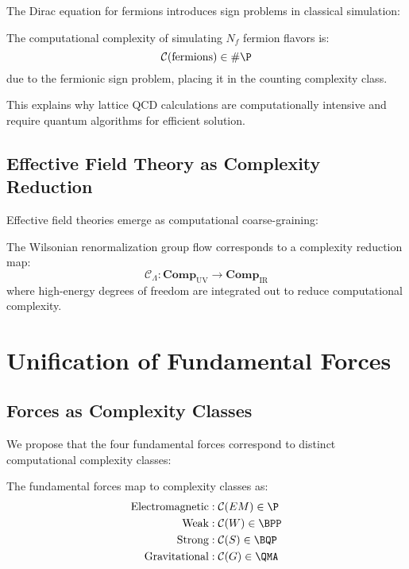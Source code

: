 \documentclass[12pt,a4paper]{article}
\newcommand{\comp}[1]{\mathcal{C}(#1)}
\newcommand{\cat}[1]{\mathbf{#1}}
\begin{document}
The Dirac equation for fermions introduces sign problems in classical simulation:

\begin{proposition}
The computational complexity of simulating $N_f$ fermion flavors is:
\begin{equation}
\comp{\text{fermions}} \in \#\P
\end{equation}
due to the fermionic sign problem, placing it in the counting complexity class.
\end{proposition}

This explains why lattice QCD calculations are computationally intensive and require quantum algorithms for efficient solution.

\subsection{Effective Field Theory as Complexity Reduction}

Effective field theories emerge as computational coarse-graining:

\begin{definition}
The Wilsonian renormalization group flow corresponds to a complexity reduction map:
\begin{equation}
\mathcal{C}_\Lambda: \cat{Comp}_{\text{UV}} \to \cat{Comp}_{\text{IR}}
\end{equation}
where high-energy degrees of freedom are integrated out to reduce computational complexity.
\end{definition}

\section{Unification of Fundamental Forces}

\subsection{Forces as Complexity Classes}

We propose that the four fundamental forces correspond to distinct computational complexity classes:

\begin{theorem}
The fundamental forces map to complexity classes as:
\begin{align}
\text{Electromagnetic} &: \comp{EM} \in \P \\
\text{Weak} &: \comp{W} \in \BPP \\
\text{Strong} &: \comp{S} \in \BQP \\
\text{Gravitational} &: \comp{G} \in \QMA
\end{align}
\end{theorem}
\end{document}
